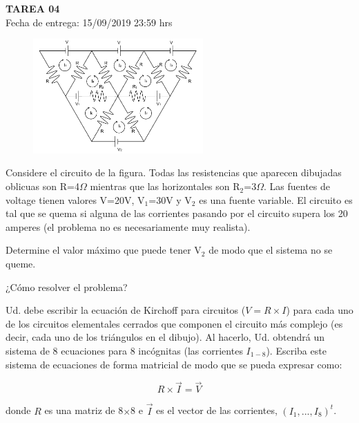 \documentclass[letter, 11pt]{article}
\newcommand{\tareanro}{04}
\newcommand{\fechaentrega}{15/09/2019 23:59 hrs}
\begin{document}
\thispagestyle{firstpage}

\begin{center}
  {\uppercase{\LARGE \bf Tarea \tareanro}}\\
  Fecha de entrega: \fechaentrega
\end{center}



\begin{figure}
  \includegraphics[width=0.58\textwidth]{circuit.pdf}
\end{figure}

Considere el circuito de la figura. Todas las resistencias que aparecen
dibujadas oblicuas son R=4$\Omega$ mientras que las horizontales son
R$_2$=3$\Omega$. Las fuentes de voltage tienen valores V=20V, V$_1$=30V y
V$_2$ es una fuente variable. El circuito es tal que se quema si alguna de las
corrientes pasando por el circuito supera los 20 amperes (el problema no es
necesariamente muy realista).

Determine el valor máximo que puede tener V$_2$ de modo que el sistema no se
queme.


\vspace{2em}
¿Cómo resolver el problema?
\vspace{1em}

Ud. debe escribir la ecuación de Kirchoff para circuitos ($V=R\times I$) para
cada uno de los circuitos elementales cerrados que componen el circuito más
complejo (es decir, cada uno de los triángulos en el dibujo). Al hacerlo, Ud.
obtendrá un sistema de 8 ecuaciones para 8 incógnitas (las corrientes
$I_{1-8}$). Escriba este sistema de ecuaciones de forma matricial de modo que
se pueda expresar como:

$$
R \times \vec{I} = \vec{V}
$$

\noindent donde $R$ es una matriz de 8$\times$8 e $\vec{I}$ es el vector de las
corrientes, $(I_1, ..., I_{8})^t$.
\end{document}
